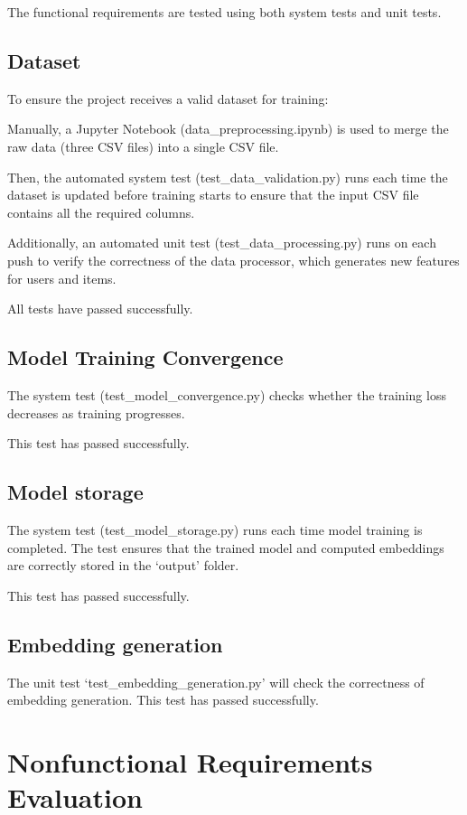 \documentclass[12pt, titlepage]{article}
\begin{document}
The functional requirements are tested using both system tests and unit tests.

\subsection{Dataset}

To ensure the project receives a valid dataset for training:

Manually, a Jupyter Notebook (data\_preprocessing.ipynb) is used to merge the raw data (three CSV files) into a single CSV file. 

Then, the automated system test (test\_data\_validation.py) runs each time the dataset is updated before training starts to ensure that the input CSV file contains all the required columns.

Additionally, an automated unit test (test\_data\_processing.py) runs on each push to verify the correctness of the data processor, which generates new features for users and items.

All tests have passed successfully.

\subsection{Model Training Convergence}
The system test (test\_model\_convergence.py) checks whether the training loss decreases as training progresses.

This test has passed successfully.

\subsection{Model storage}

The system test (test\_model\_storage.py) runs each time model training is completed. The test ensures that the trained model and computed embeddings are correctly stored in the `output' folder.

This test has passed successfully.

\subsection{Embedding generation}

The unit test `test\_embedding\_generation.py' will check the correctness of embedding generation. This test has passed successfully.

\section{Nonfunctional Requirements Evaluation}
\end{document}
